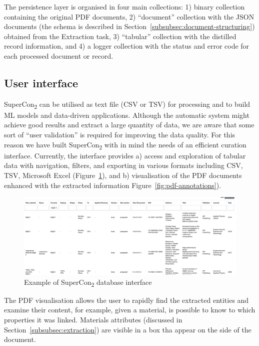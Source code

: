 \documentclass{article}
\begin{document}
The persistence layer is organised in four main collections: 1) binary collection containing the original PDF documents, 2) ``document'' collection with the JSON documents (the schema is described in Section~\ref{subsubsec:document-structuring}) obtained from the Extraction task, 3) ``tabular'' collection with the distilled record information, and 4) a logger collection with the status and error code for each processed document or record. 

\subsection{User interface}
\label{sucsec:supercon2-user-interface}
SuperCon\textsubscript{2} can be utilised as text file (CSV or TSV) for processing and to build ML models and data-driven applications. 
Although the automatic system might achieve good results and extract a large quantity of data, we are aware that some sort of ``user validation'' is required for improving the data quality. For this reason we have built SuperCon\textsubscript{2} with in mind the needs of an efficient curation interface. 
Currently, the interface provides a) access and exploration of tabular data with navigation, filters, and exporting in various formats including CSV, TSV, Microsoft Excel (Figure~\ref{fig:interface-supercon2}), and b) visualisation of the PDF documents enhanced with the extracted information Figure~\ref{fig:pdf-annotations}). 

\begin{figure}[ht]
\includegraphics[width=\textwidth]{sample-database-interface}
\caption{\label{fig:interface-supercon2} Example of SuperCon\textsubscript{2} database interface}
\end{figure}

The PDF visualisation allows the user to rapidly find the extracted entities and examine their content, for example, given a material, is possible to know to which properties it was linked. 
Materials attributes (discussed in Section~\ref{subsubsec:extraction}) are visible in a box tha appear on the side of the document. 
\end{document}
